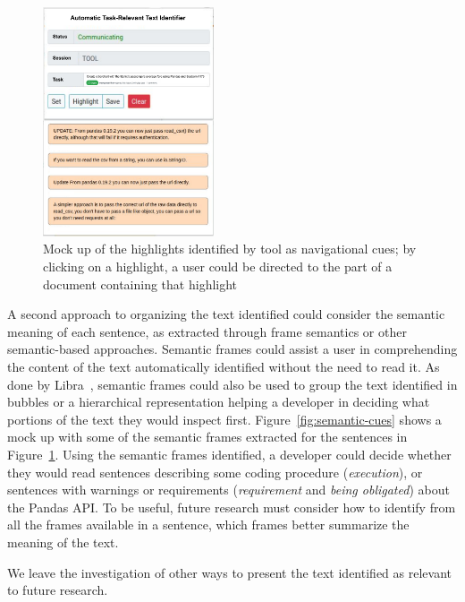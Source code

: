 \begin{figure}[H]
    \centering
    \includegraphics[width=0.45\textwidth]{fig/cp7/navigational-cues}
    \caption{Mock up of the highlights identified by \acs{tool} as navigational cues; by clicking on a highlight, a user could be directed to the part of a document containing that highlight}
    \label{fig:navigational-cues}
\end{figure}



A second approach to organizing the text identified could consider 
the semantic meaning of each sentence, as extracted through frame semantics or other semantic-based approaches. 
Semantic frames could 
assist a user in comprehending the content of the text automatically identified
without the need to read it. 
As done by Libra~\cite{Ponzanelli2017}, semantic frames could also be used to group the text identified in bubbles or a hierarchical representation 
 helping a developer
in deciding what portions of the text they would inspect first. 
Figure~\ref{fig:semantic-cues} shows a mock up 
with some of the semantic frames extracted 
for the sentences in Figure~\ref{fig:navigational-cues}.
Using the semantic frames identified,
a developer could decide whether they would read sentences 
describing some coding procedure (\textit{execution}), or sentences 
with warnings or requirements (\textit{requirement} and \textit{being obligated})
about the Pandas API. 
To be useful, future research must consider how to identify from all the frames available in a sentence, 
which frames
better summarize the meaning of the text. 


We leave the investigation of other ways to present the text identified as relevant to future research.




